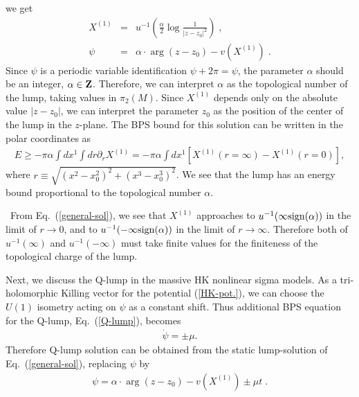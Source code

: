 \documentclass[a4paper,12pt]{article}
\begin{document}
we get 
\begin{eqnarray}
  X^{(1)} &=& u^{-1}\left( \frac{\alpha}{2}
   \log \frac{1}{|z-z_0|^2}\right) \;, \nonumber \\
  \psi &=& \alpha\cdot \arg (z-z_0) -v(X^{(1)}) \;.
  \label{general-sol}
\end{eqnarray}
Since $\psi$ is a periodic variable identification $\psi+2\pi=\psi$, 
the parameter $\alpha$ should be 
an integer, $\alpha \in {\bf Z}$. 
Therefore, we can interpret $\alpha$ as 
the topological number of the lump, 
 taking values in $\pi_2(M)$. 
Since $X^{(1)}$ depends only on 
the absolute value $|z-z_0|$, 
we can interpret the parameter $z_0$ as 
the position of the center of the lump in the $z$-plane. 
The BPS bound for this solution can be written 
in the polar coordinates as 
\begin{eqnarray}
  E \ge -\pi\alpha\int dx^1 \int dr \partial_r X^{(1)}
     = -\pi\alpha\int dx^1 [X^{(1)}(r=\infty)-X^{(1)}(r=0)], 
\end{eqnarray}
where $r\equiv \sqrt{(x^2-x_0^2)^2 + (x^3-x_0^3)^2}$. 
We see that the lump has an energy bound proportional to 
the topological number $\alpha$.

~From Eq.~(\ref{general-sol}), we see that $X^{(1)}$ approaches to 
$u^{-1}(\infty{\rm sign}(\alpha))$ 
in the limit of $r\to 0$, and to $u^{-1}(-\infty{\rm sign}(\alpha))$ 
in the limit of $r\to \infty$. 
Therefore both of $u^{-1}(\infty)$ and $u^{-1}(-\infty)$ must 
take finite values for the finiteness of 
the topological charge of the lump.

Next, we discuss the Q-lump in the massive HK nonlinear sigma models. 
As a tri-holomorphic Killing vector for 
the potential (\ref{HK-pot.}), 
we can choose the $U(1)$ isometry acting on $\psi$ as 
a constant shift.
Thus additional BPS equation for the Q-lump, 
Eq.~(\ref{Q-lump}), becomes 
\begin{eqnarray}
 \dot{\psi} = \pm \mu .
\end{eqnarray}
Therefore Q-lump solution can be obtained from 
the static lump-solution of Eq.~(\ref{general-sol}), 
replacing $\psi$ by 
\begin{eqnarray}
  \psi = \alpha\cdot \arg (z-z_0) -v(X^{(1)}) \pm \mu t \;.
\label{Qlump-sol}
\end{eqnarray}


\end{document}
